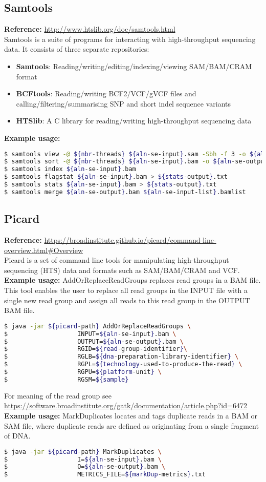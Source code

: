 \documentclass[8pt]{article}
\begin{document}
\subsection*{Samtools}
\textbf{Reference:} \url{http://www.htslib.org/doc/samtools.html}\\
Samtools is a suite of programs for interacting with high-throughput sequencing data. It consists of three separate repositories:
\begin{itemize}
	\item \textbf{Samtools}: Reading/writing/editing/indexing/viewing SAM/BAM/CRAM format
	\item \textbf{BCFtools}: Reading/writing BCF2/VCF/gVCF files and calling/filtering/summarising SNP and short indel sequence variants
	\item \textbf{HTSlib}: A C library for reading/writing high-throughput sequencing data
\end{itemize}
\textbf{Example usage:}
\begin{lstlisting}[language=bash]
$ samtools view -@ ${nbr-threads} ${aln-se-input}.sam -Sbh -f 3 -o ${aln-se-output}.bam
$ samtools sort -@ ${nbr-threads} ${aln-se-input}.bam -o ${aln-se-output}.bam
$ samtools index ${aln-se-input}.bam
$ samtools flagstat ${aln-se-input}.bam > ${stats-output}.txt
$ samtools stats ${aln-se-input}.bam > ${stats-output}.txt
$ samtools merge ${aln-se-output}.bam ${aln-se-input-list}.bamlist
\end{lstlisting}
\subsection*{Picard}
\textbf{Reference:} \url{https://broadinstitute.github.io/picard/command-line-overview.html#Overview}\\
Picard is a set of command line tools for manipulating high-throughput sequencing (HTS) data and formats such as SAM/BAM/CRAM and VCF.\\
\textbf{Example usage:} AddOrReplaceReadGroups replaces read groups in a BAM file. This tool enables the user to replace all read groups in the INPUT file with a single new read group and assign all reads to this read group in the OUTPUT BAM file.
\begin{lstlisting}[language=bash]
$ java -jar ${picard-path} AddOrReplaceReadGroups \
$					INPUT=${aln-se-input}.bam \
$					OUTPUT=${aln-se-output}.bam \
$					RGID=${read-group-identifier}\
$					RGLB=${dna-preparation-library-identifier} \
$					RGPL=${technology-used-to-produce-the-read} \
$					RGPU=${platform-unit} \
$					RGSM=${sample}
\end{lstlisting}
For meaning of the read group see \url{https://software.broadinstitute.org/gatk/documentation/article.php?id=6472}\\
\textbf{Example usage:} MarkDuplicates locates and tags duplicate reads in a BAM or SAM file, where duplicate reads are defined as originating from a single fragment of DNA. 
\begin{lstlisting}[language=bash]
$ java -jar ${picard-path} MarkDuplicates \
$					I=${aln-se-input}.bam \
$					O=${aln-se-output}.bam \
$					METRICS_FILE=${markDup-metrics}.txt
\end{lstlisting}
\end{document}
